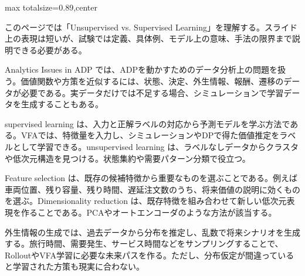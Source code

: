 \begin{minipage}[t]{0.58\textwidth}
\begin{adjustbox}{max totalsize={\textwidth}{0.89\textheight},center}
\begin{minipage}{\textwidth}\scriptsize
{}このページでは「Unsupervised vs. Supervised Learning」を理解する。スライド上の表現は短いが、試験では定義、具体例、モデル上の意味、手法の限界まで説明できる必要がある。\par
Analytics Issues in ADP では、ADPを動かすためのデータ分析上の問題を扱う。価値関数や方策を近似するには、状態、決定、外生情報、報酬、遷移のデータが必要である。実データだけでは不足する場合、シミュレーションで学習データを生成することもある。\par
supervised learning は、入力と正解ラベルの対応から予測モデルを学ぶ方法である。VFAでは、特徴量を入力し、シミュレーションやDPで得た価値推定をラベルとして学習できる。unsupervised learning は、ラベルなしデータからクラスタや低次元構造を見つける。状態集約や需要パターン分類で役立つ。\par
Feature selection は、既存の候補特徴から重要なものを選ぶことである。例えば車両位置、残り容量、残り時間、遅延注文数のうち、将来価値の説明に効くものを選ぶ。Dimensionality reduction は、既存特徴を組み合わせて新しい低次元表現を作ることである。PCAやオートエンコーダのような方法が該当する。\par
外生情報の生成では、過去データから分布を推定し、乱数で将来シナリオを生成する。旅行時間、需要発生、サービス時間などをサンプリングすることで、RolloutやVFA学習に必要な未来パスを作る。ただし、分布仮定が間違っていると学習された方策も現実に合わない。\par

\end{minipage}
\end{adjustbox}
\end{minipage}
